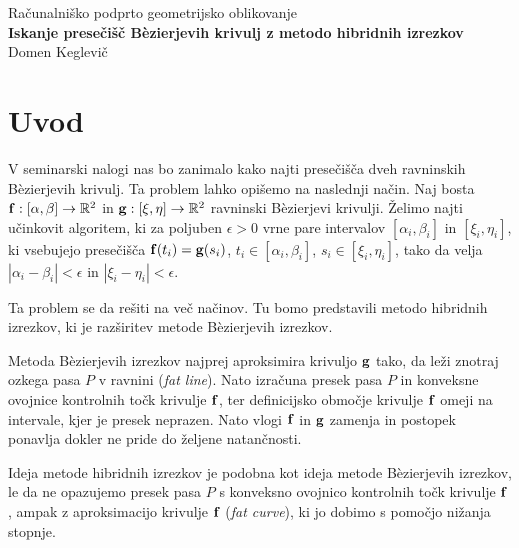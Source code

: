 \documentclass[12pt,a4paper, reqno]{amsart}
\def\R{\mathbb R}
\begin{document}
\thispagestyle{empty}
\medskip
\begin{center}{\large
Računalniško podprto geometrijsko oblikovanje\\[4mm]
{\bf Iskanje presečišč B\`{e}zierjevih krivulj z metodo hibridnih izrezkov}\\[4mm]
Domen Keglevič\\[6mm]
}
\end{center}
\medskip
\section{Uvod}
V seminarski nalogi nas bo zanimalo kako najti presečišča dveh ravninskih B\`{e}zier\-jevih krivulj. Ta problem lahko opišemo na naslednji način. Naj bosta ${\bf f}:[\alpha,\beta]\rightarrow \R^2$ in ${\bf g}:[\xi,\eta]\rightarrow \R^2$ ravninski B\`{e}zierjevi krivulji. Želimo najti učinkovit algoritem, ki za poljuben $\epsilon >0$ vrne pare intervalov $[\alpha_i,\beta_i]$ in $[\xi_i,\eta_i]$, ki vsebujejo presečišča ${\bf f}(t_i) = {\bf g}(s_i)$, $t_i\in[\alpha_i,\beta_i]$, $s_i\in[\xi_i,\eta_i]$, tako da velja $|\alpha _i - \beta _i| < \epsilon$ in $|\xi _i - \eta _i| < \epsilon$.

Ta problem se da rešiti na več načinov. Tu bomo predstavili metodo hibridnih izrezkov, ki je razširitev metode B\`{e}zierjevih izrezkov. 

Metoda B\`{e}zierjevih izrezkov najprej aproksimira krivuljo ${\bf g}$ tako, da leži znotraj ozkega pasa $P$ v ravnini ({\em fat line}). Nato izračuna presek pasa $P$ in konveksne ovojnice kontrolnih točk krivulje ${\bf f}$, ter definicijsko območje krivulje ${\bf f}$ omeji na intervale, kjer je presek neprazen. Nato vlogi ${\bf f}$ in ${\bf g}$ zamenja in postopek ponavlja dokler ne pride do željene natančnosti.

Ideja metode hibridnih izrezkov je podobna kot ideja metode B\`{e}zierjevih izrezkov, le da ne opazujemo presek pasa $P$ s konveksno ovojnico kontrolnih točk krivulje ${\bf f}$, ampak z aproksimacijo krivulje ${\bf f}$ ({\em fat curve}), ki jo dobimo s pomočjo nižanja stopnje.
\end{document}
